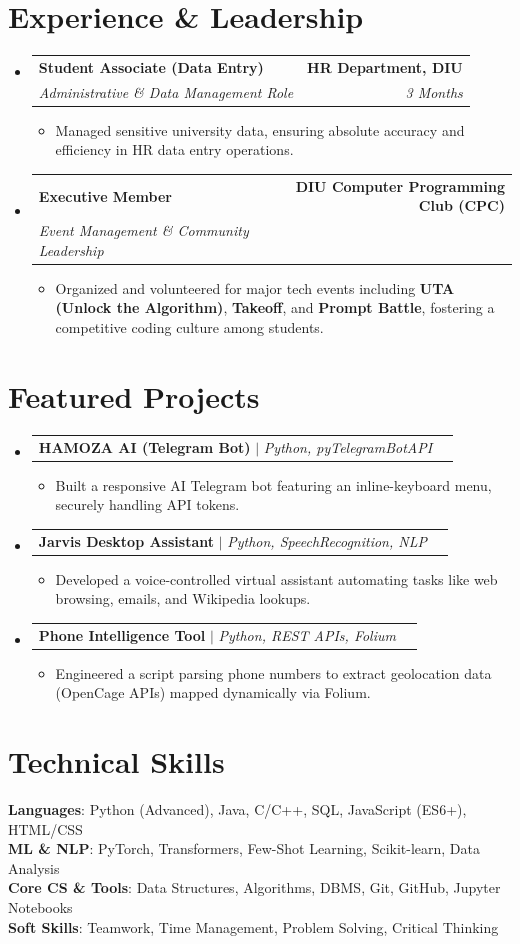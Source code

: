 \documentclass[letterpaper,10.5pt]{article}
\makeatletter
\newcommand{\resumeItem}[1]{
  \item\small{
    {#1 \vspace{-2pt}}
  }
}
\newcommand{\resumeSubheading}[4]{
  \vspace{-2pt}\item
    \begin{tabular*}{1.0\textwidth}[t]{l@{\extracolsep{\fill}}r}
      \textbf{#1} & \textbf{#2} \\
      \textit{\small#3} & \textit{\small #4} \\
    \end{tabular*}\vspace{-7pt}
}
\newcommand{\resumeProjectHeading}[2]{
    \item
    \begin{tabular*}{1.0\textwidth}{l@{\extracolsep{\fill}}r}
      \small#1 & \textbf{\small #2} \\
    \end{tabular*}\vspace{-7pt}
}
\newcommand{\resumeSubHeadingListStart}{\begin{itemize}[leftmargin=0.15in, label={}]}
\newcommand{\resumeSubHeadingListEnd}{\end{itemize}}
\newcommand{\resumeItemListStart}{\begin{itemize}}
\newcommand{\resumeItemListEnd}{\end{itemize}\vspace{-5pt}}
\makeatother
\begin{document}
\section{Experience \& Leadership}
  \resumeSubHeadingListStart
    \resumeSubheading
      {Student Associate (Data Entry)}{HR Department, DIU}
      {Administrative \& Data Management Role}{3 Months}
      \resumeItemListStart
        \resumeItem{Managed sensitive university data, ensuring absolute accuracy and efficiency in HR data entry operations.}
      \resumeItemListEnd

    \resumeSubheading
      {Executive Member}{DIU Computer Programming Club (CPC)}
      {Event Management \& Community Leadership}{}
      \resumeItemListStart
        \resumeItem{Organized and volunteered for major tech events including \textbf{UTA (Unlock the Algorithm)}, \textbf{Takeoff}, and \textbf{Prompt Battle}, fostering a competitive coding culture among students.}
      \resumeItemListEnd
  \resumeSubHeadingListEnd

\section{Featured Projects}
    \resumeSubHeadingListStart
      \resumeProjectHeading
          {\textbf{HAMOZA AI (Telegram Bot)} $|$ \emph{Python, pyTelegramBotAPI}}{}
          \resumeItemListStart
            \resumeItem{Built a responsive AI Telegram bot featuring an inline-keyboard menu, securely handling API tokens.}
          \resumeItemListEnd
      \resumeProjectHeading
          {\textbf{Jarvis Desktop Assistant} $|$ \emph{Python, SpeechRecognition, NLP}}{}
          \resumeItemListStart
            \resumeItem{Developed a voice-controlled virtual assistant automating tasks like web browsing, emails, and Wikipedia lookups.}
          \resumeItemListEnd
      \resumeProjectHeading
          {\textbf{Phone Intelligence Tool} $|$ \emph{Python, REST APIs, Folium}}{}
          \resumeItemListStart
            \resumeItem{Engineered a script parsing phone numbers to extract geolocation data (OpenCage APIs) mapped dynamically via Folium.}
          \resumeItemListEnd
    \resumeSubHeadingListEnd

\section{Technical Skills}
 \begin{itemize}[leftmargin=0.15in, label={}]
    \small{\item{
     \textbf{Languages}{: Python (Advanced), Java, C/C++, SQL, JavaScript (ES6+), HTML/CSS} \\
     \textbf{ML \& NLP}{: PyTorch, Transformers, Few-Shot Learning, Scikit-learn, Data Analysis} \\
     \textbf{Core CS \& Tools}{: Data Structures, Algorithms, DBMS, Git, GitHub, Jupyter Notebooks} \\
     \textbf{Soft Skills}{: Teamwork, Time Management, Problem Solving, Critical Thinking}
    }}
 \end{itemize}
\end{document}

